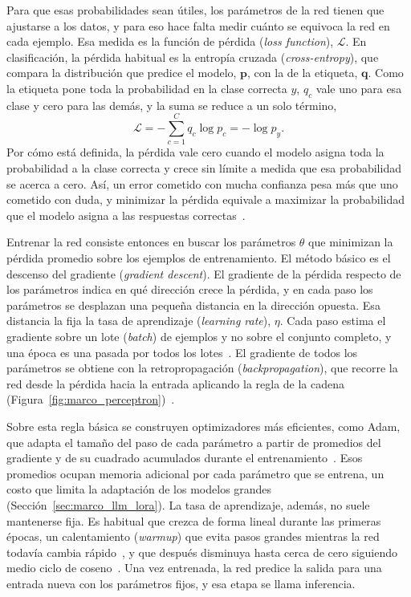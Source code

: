 Para que esas probabilidades sean útiles, los parámetros de la red tienen que ajustarse a los datos, y para eso
hace falta medir cuánto se equivoca la red en cada ejemplo. Esa medida es la función de pérdida (\emph{loss
function}), $\mathcal{L}$. En clasificación, la pérdida habitual es la entropía cruzada (\emph{cross-entropy}),
que compara la distribución que predice el modelo, $\mathbf{p}$, con la de la etiqueta, $\mathbf{q}$. Como la
etiqueta pone toda la probabilidad en la clase correcta $y$, $q_c$ vale uno para esa clase y cero para las
demás, y la suma se reduce a un solo término,
\begin{equation}
    \mathcal{L} = -\sum_{c=1}^{C} q_c \log p_c = -\log p_y.
    \label{eq:marco_entropia}
\end{equation}
Por cómo está definida, la pérdida vale cero cuando el modelo asigna toda la probabilidad a la clase correcta y
crece sin límite a medida que esa probabilidad se acerca a cero. Así, un error cometido con mucha confianza pesa
más que uno cometido con duda, y minimizar la pérdida equivale a maximizar la probabilidad que el modelo asigna a
las respuestas correctas~\cite{goodfellow2016deep}.

Entrenar la red consiste entonces en buscar los parámetros $\theta$ que minimizan la pérdida promedio sobre los
ejemplos de entrenamiento. El método básico es el descenso del gradiente (\emph{gradient descent}). El gradiente
de la pérdida respecto de los parámetros indica en qué dirección crece la pérdida, y en cada paso los parámetros
se desplazan una pequeña distancia en la dirección opuesta. Esa distancia la fija la tasa de aprendizaje
(\emph{learning rate}), $\eta$. Cada paso estima el gradiente sobre un lote (\emph{batch}) de ejemplos y no
sobre el conjunto completo, y una época es una pasada por todos los lotes~\cite{goodfellow2016deep}. El gradiente
de todos los parámetros se obtiene con la retropropagación (\emph{backpropagation}), que recorre la red desde la
pérdida hacia la entrada aplicando la regla de la cadena (Figura~\ref{fig:marco_perceptron})~\cite{rumelhart1986learning}.

Sobre esta regla básica se construyen optimizadores más eficientes, como Adam, que adapta el tamaño del paso de
cada parámetro a partir de promedios del gradiente y de su cuadrado acumulados durante el
entrenamiento~\cite{kingma2015adam}. Esos promedios ocupan memoria adicional por cada parámetro que se entrena,
un costo que limita la adaptación de los modelos grandes (Sección~\ref{sec:marco_llm_lora}). La tasa de
aprendizaje, además, no suele mantenerse fija. Es habitual que crezca de forma lineal durante las primeras
épocas, un calentamiento (\emph{warmup}) que evita pasos grandes mientras la red todavía cambia
rápido~\cite{goyal2017accurate}, y que después disminuya hasta cerca de cero siguiendo medio ciclo de
coseno~\cite{loshchilov2017sgdr}. Una vez entrenada, la red predice la salida para una entrada nueva con los
parámetros fijos, y esa etapa se llama inferencia.


